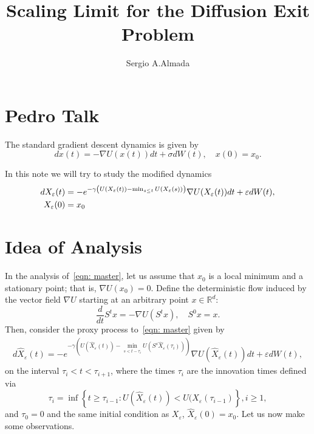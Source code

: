 \documentclass{amsproc}
\title{Scaling Limit for the Diffusion Exit Problem}
\author{Sergio A.Almada}
\newcommand{\R}{\mathbb{R}}
\newcommand{\eps}{\varepsilon}
\newcommand{\x}{X_\eps}
\newcommand{\hatx}{\hat X_\eps}
\begin{document}
\section{Pedro Talk}

The standard gradient descent dynamics is given by
\[
d x (t) = - \nabla U ( x(t) )dt + \sigma dW(t), \quad x(0) = x_0.
\]

In this note we will try to study the modified dynamics
\begin{align} \notag
d\x(t) &=  -e^{ -\gamma \left (  U(\x(t)) - \min_{s\leq t} U(\x(s))  \right ) } \nabla U ( \x(t) )dt + \eps dW(t), \\ 
\x(0)  &= x_0  \label{eqn: master}
\end{align}


\section{Idea of Analysis}
In the analysis of~\eqref{eqn: master}, let us assume that $x_0$ is a local minimum and a stationary point; that is, $\nabla U(x_0) = 0$. Define the deterministic flow induced by the vector field $\nabla U$ starting at an arbitrary point $x\in \R^d$:
\begin{equation} \label{eqn: master_zero_noise}
\frac{d}{dt} S^t x = -\nabla U ( S^t x), \quad S^0 x = x.
\end{equation}
Then, consider the proxy process to~\eqref{eqn: master} given by 
\begin{align} \label{eqn: hat}
d \hatx (t) =  -e^{ -\gamma \left (  U(\hatx(t)) - \min_{s < t - \tau_i} U(S^s \hatx(\tau_i))  \right ) } \nabla U ( \hatx(t) )dt + \eps dW(t), 
\end{align}
on the interval $\tau_i < t < \tau_{i+1}$, where the times $\tau_i$ are the innovation times defined via $$\tau_i = \inf \left\{  t \geq \tau_{i-1}: U( \hatx (t) ) < U( \hatx (\tau_{i-1})  \right \},  i \geq 1,$$ and $\tau_0 = 0$ and the same initial condition as $\x$, $\hatx (0) = x_0$. Let us now make some observations. 
\end{document}
